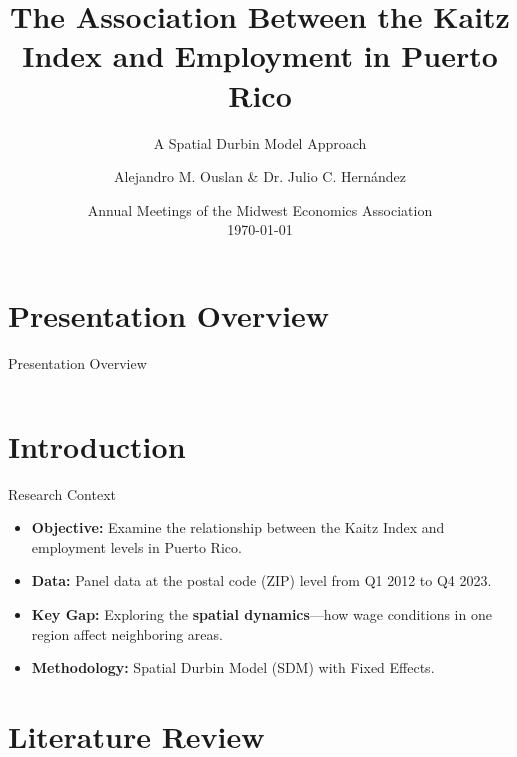 \documentclass[11pt]{beamer}
\title{The Association Between the Kaitz Index and Employment in Puerto Rico}
\subtitle{A Spatial Durbin Model Approach}
\author[Ouslan]{\small{
  Alejandro M. Ouslan \& Dr. Julio C. Hernández}\\
}
\institute[UPRM]{University of Puerto Rico, Mayagüez}
\date[\today]{\small{Annual Meetings of the Midwest Economics Association}\\
\vspace{2mm}
\footnotesize{\today}}
\begin{document}
{
\begin{frame}
	\titlepage
\end{frame}
}


\section*{Presentation Overview}
\begin{frame}{Presentation Overview}

	\begin{columns}[T,onlytextwidth]
		\tableofcontents[sections={1-3}]

		\tableofcontents[sections={4-6}]
	\end{columns}

\end{frame}

\section{Introduction}

\begin{frame}{Research Context}
	\begin{itemize}
		\item \textbf{Objective:} Examine the relationship between the Kaitz Index and employment levels in Puerto Rico.
		\item \textbf{Data:} Panel data at the postal code (ZIP) level from Q1 2012 to Q4 2023.
		\item \textbf{Key Gap:} Exploring the \textbf{spatial dynamics}—how wage conditions in one region affect neighboring areas.
		\item \textbf{Methodology:} Spatial Durbin Model (SDM) with Fixed Effects.
	\end{itemize}
\end{frame}

\section{Literature Review}
\end{document}
